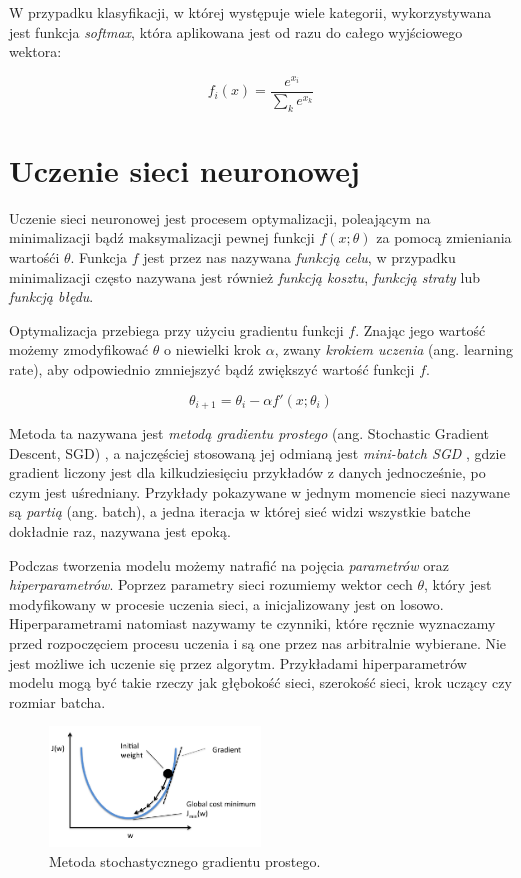 \documentclass[licencjacka]{pracamgr}
\begin{document}
W przypadku klasyfikacji, w której występuje wiele kategorii, wykorzystywana jest funkcja \emph{softmax}, która aplikowana jest od razu do całego wyjściowego wektora:


$$ f_i(x) = \frac{e^{x_i}}{\sum_k e^{x_k}} $$


\section{Uczenie sieci neuronowej}

Uczenie sieci neuronowej jest procesem optymalizacji, poleającym na minimalizacji bądź maksymalizacji pewnej funkcji $ f(x; \theta) $ za pomocą zmieniania wartośći $ \theta $. Funkcja $ f $ jest przez nas nazywana \emph{funkcją celu}, w przypadku minimalizacji często nazywana jest również \emph{funkcją kosztu}, \emph{funkcją straty} lub \emph{funkcją błędu}. 

Optymalizacja przebiega przy użyciu gradientu funkcji $ f $. Znając jego wartość możemy zmodyfikować $\theta$ o niewielki krok $ \alpha $, zwany \emph{krokiem uczenia} (ang. learning rate), aby odpowiednio zmniejszyć bądź zwiększyć wartość funkcji $ f $. 

$$ \theta_{i+1} = \theta_i - \alpha f'(x; \theta_i) $$

Metoda ta nazywana jest \emph{metodą gradientu prostego} (ang. Stochastic Gradient Descent, SGD) \cite{sgd}, a najczęściej stosowaną jej odmianą jest \emph{mini-batch SGD} \cite{mini-batch-sgd}, gdzie gradient liczony jest dla kilkudziesięciu przykładów z danych jednocześnie, po czym jest uśredniany. Przykłady pokazywane w jednym momencie sieci nazywane są \emph{partią} (ang. batch), a jedna iteracja w której sieć widzi wszystkie batche dokładnie raz, nazywana jest epoką.

Podczas tworzenia modelu możemy natrafić na pojęcia \emph{parametrów} oraz \emph{hiperparametrów}. Poprzez parametry sieci rozumiemy wektor cech $\theta$, który jest modyfikowany w procesie uczenia sieci, a inicjalizowany jest on losowo. Hiperparametrami natomiast nazywamy te czynniki, które ręcznie wyznaczamy przed rozpoczęciem procesu uczenia i są one przez nas arbitralnie wybierane. Nie jest możliwe ich uczenie się przez algorytm. Przykładami hiperparametrów modelu mogą być takie rzeczy jak głębokość sieci, szerokość sieci, krok uczący czy rozmiar batcha.

\begin{figure}[ht]
  \centering
  \includegraphics[width=0.5\textwidth]{sgd}
  \caption{Metoda stochastycznego gradientu prostego. \cite{sgd-img}}
\end{figure}
\end{document}
